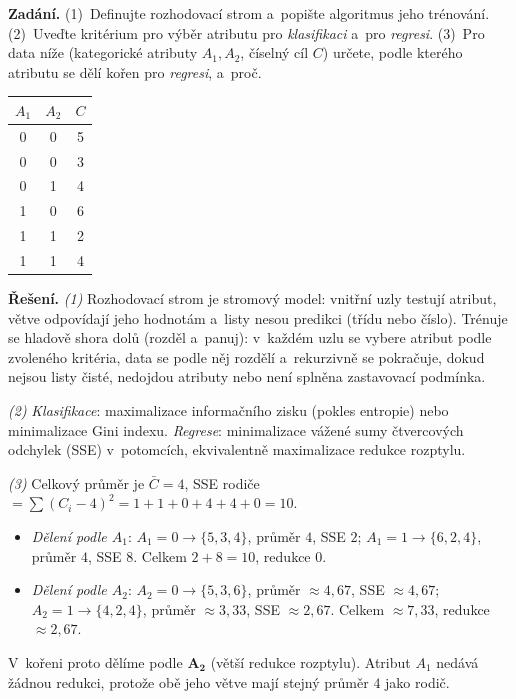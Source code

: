 \begin{priklad}
\par
\textbf{Zadání.} (1)~Definujte rozhodovací strom a~popište algoritmus jeho trénování. (2)~Uveďte kritérium pro výběr atributu pro \emph{klasifikaci} a~pro \emph{regresi}. (3)~Pro data níže (kategorické atributy $A_1,A_2$, číselný cíl $C$) určete, podle kterého atributu se dělí kořen pro \emph{regresi}, a~proč.

\smallskip
\begin{center}\small
\begin{tabular}{ccc}
\toprule
$A_1$ & $A_2$ & $C$ \\
\midrule
0 & 0 & 5 \\ 0 & 0 & 3 \\ 0 & 1 & 4 \\
1 & 0 & 6 \\ 1 & 1 & 2 \\ 1 & 1 & 4 \\
\bottomrule
\end{tabular}
\end{center}

\smallskip
\textbf{Řešení.} \emph{(1)} Rozhodovací strom je stromový model: vnitřní uzly testují atribut, větve odpovídají jeho hodnotám a~listy nesou predikci (třídu nebo číslo). Trénuje se hladově shora dolů (rozděl a~panuj): v~každém uzlu se vybere atribut podle zvoleného kritéria, data se podle něj rozdělí a~rekurzivně se pokračuje, dokud nejsou listy čisté, nedojdou atributy nebo není splněna zastavovací podmínka.

\emph{(2)} \emph{Klasifikace}: maximalizace informačního zisku (pokles entropie) nebo minimalizace Gini indexu. \emph{Regrese}: minimalizace vážené sumy čtvercových odchylek (SSE) v~potomcích, ekvivalentně maximalizace redukce rozptylu.

\emph{(3)} Celkový průměr je $\bar C = 4$, SSE rodiče $=\sum (C_i-4)^2 = 1+1+0+4+4+0 = \boxed{10}$.
\begin{itemize}
  \item \emph{Dělení podle $A_1$}: $A_1{=}0 \to \{5,3,4\}$, průměr $4$, SSE $2$; $A_1{=}1 \to \{6,2,4\}$, průměr $4$, SSE $8$. Celkem $2+8=10$, redukce $\boxed{0}$.
  \item \emph{Dělení podle $A_2$}: $A_2{=}0 \to \{5,3,6\}$, průměr $\approx 4{,}67$, SSE $\approx 4{,}67$; $A_2{=}1 \to \{4,2,4\}$, průměr $\approx 3{,}33$, SSE $\approx 2{,}67$. Celkem $\approx 7{,}33$, redukce $\boxed{\approx 2{,}67}$.
\end{itemize}
V~kořeni proto dělíme podle $\mathbf{A_2}$ (větší redukce rozptylu). Atribut $A_1$ nedává žádnou redukci, protože obě jeho větve mají stejný průměr $4$ jako rodič.
\end{priklad}

